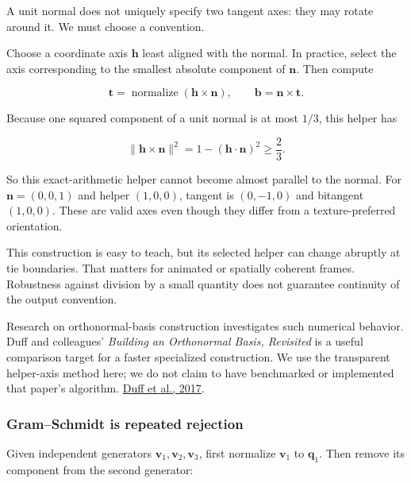 \hypertarget{01-foundations-i-ch017-build-a-frame-from-one-direction}{}

A unit normal does not uniquely specify two tangent axes: they may rotate around it. We must choose a convention.

Choose a coordinate axis \(\mathbf h\) least aligned with the normal. In practice, select the axis corresponding to the smallest absolute component of \(\mathbf n\). Then compute

\[
\mathbf t=\operatorname{normalize}(\mathbf h\times\mathbf n),
\qquad \mathbf b=\mathbf n\times\mathbf t.
\]

Because one squared component of a unit normal is at most \(1/3\), this helper has

\[
\|\mathbf h\times\mathbf n\|^2
=1-(\mathbf h\cdot\mathbf n)^2\ge\frac23.
\]

So this exact-arithmetic helper cannot become almost parallel to the normal. For \(\mathbf n=(0,0,1)\) and helper \((1,0,0)\), tangent is \((0,-1,0)\) and bitangent \((1,0,0)\). These are valid axes even though they differ from a texture-preferred orientation.

This construction is easy to teach, but its selected helper can change abruptly at tie boundaries. That matters for animated or spatially coherent frames. Robustness against division by a small quantity does not guarantee continuity of the output convention.

Research on orthonormal-basis construction investigates such numerical behavior. Duff and colleagues' \emph{Building an Orthonormal Basis, Revisited} is a useful comparison target for a faster specialized construction. We use the transparent helper-axis method here; we do not claim to have benchmarked or implemented that paper's algorithm. \href{https://graphics.pixar.com/library/OrthonormalB/paper.pdf}{Duff et al., 2017}.

\subsubsection{Gram--Schmidt is repeated rejection}\label{01-foundations-i-ch017-gramschmidt-is-repeated-rejection}

\hypertarget{01-foundations-i-ch017-gramschmidt-is-repeated-rejection}{}

Given independent generators \(\mathbf v_1,\mathbf v_2,\mathbf v_3\), first normalize \(\mathbf v_1\) to \(\mathbf q_1\). Then remove its component from the second generator:

